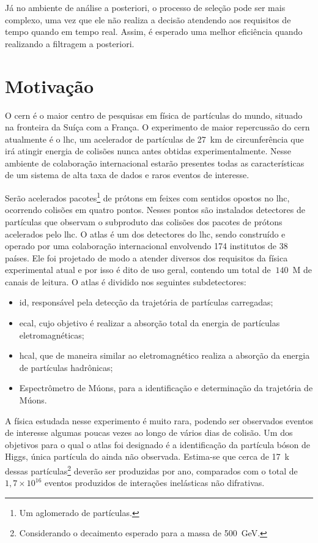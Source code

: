 Já no ambiente de análise a posteriori, o processo de seleção pode ser mais
complexo, uma vez que ele não realiza a decisão atendendo aos
requisitos de tempo quando em tempo real. Assim, é esperado 
uma melhor eficiência quando realizando a filtragem a posteriori.

\section{Motivação}

O \gls{cern} é o maior centro de
pesquisas em física de partículas do mundo, situado na fronteira da Suíça com a
França. O experimento de maior repercussão do \gls{cern} atualmente é o \gls{lhc}, 
um acelerador de partículas de 27~km de
circunferência que irá atingir energia de colisões nunca antes obtidas
experimentalmente. 
Nesse ambiente de colaboração internacional estarão presentes
todas as características de um sistema de alta taxa de dados e raros eventos de
interesse.

Serão acelerados pacotes\footnote{Um aglomerado de partículas.} de prótons em
feixes com sentidos opostos no \gls{lhc},
ocorrendo colisões em quatro pontos. Nesses pontos são instalados 
detectores de partículas que observam o subproduto das colisões dos pacotes de prótons 
acelerados pelo \gls{lhc}. O \gls{atlas} é um dos detectores do
\gls{lhc}, sendo construído e operado por uma colaboração internacional envolvendo 174 institutos de 38
países. Ele foi projetado de modo a atender diversos dos requisitos da física 
experimental atual e por isso é dito de uso geral, contendo um total de $~140$~M 
de canais de leitura. O \gls{atlas} é dividido nos seguintes subdetectores:

\begin{itemize}
\item \gls{id}, responsável pela detecção da trajetória de partículas carregadas;
\item \gls{ecal}, cujo objetivo é realizar a absorção total da
energia de partículas eletromagnéticas;
\item \gls{hcal}, que de maneira similar ao eletromagnético realiza a
absorção da energia de partículas hadrônicas;
\item Espectrômetro de Múons, para a identificação e determinação da trajetória de
Múons.
\end{itemize}

A física estudada nesse experimento é muito rara, podendo ser observados eventos
de interesse algumas poucas vezes ao longo de vários dias de colisão. 
Um dos objetivos para o qual o \gls{atlas} foi 
designado é a identificação da partícula bóson de Higgs, única partícula 
do  ainda não observada. Estima-se que cerca de 17~k dessas
partículas\footnote{Considerando o decaimento esperado para a massa de 500~GeV.} deverão ser produzidas por ano, comparados
com o total de $1,7\times10^{16}$ eventos produzidos de interações inelásticas
não difrativas. 

